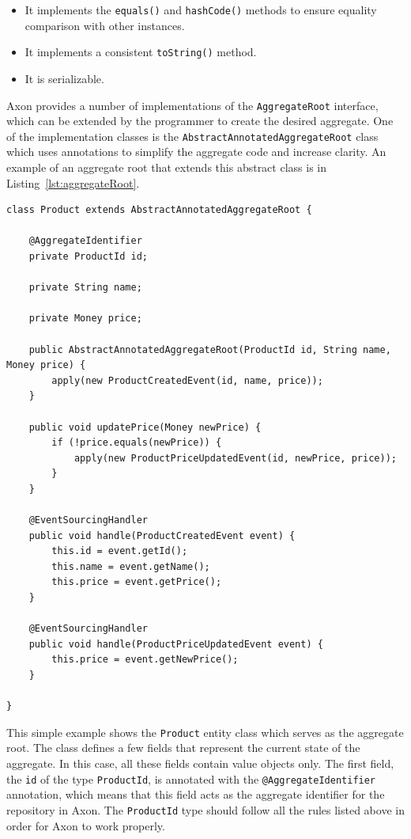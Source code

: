 \documentclass{book}
\begin{document}
\begin{itemize}
\tightlist
\item
  It implements the \texttt{equals()} and \texttt{hashCode()} methods to
  ensure equality comparison with other instances.
\item
  It implements a consistent \texttt{toString()} method.
\item
  It is serializable.
\end{itemize}

Axon provides a number of implementations of the \texttt{AggregateRoot}
interface, which can be extended by the programmer to create the desired
aggregate. One of the implementation classes is the
\texttt{AbstractAnnotatedAggregateRoot} class which uses annotations to
simplify the aggregate code and increase clarity. An example of an
aggregate root that extends this abstract class is in Listing~\ref{lst:aggregateRoot}.

\begin{lstlisting}[caption={An example of an annotated-based aggregate root class in Axon},label={lst:aggregateRoot},captionpos=b,float,floatplacement=H]
class Product extends AbstractAnnotatedAggregateRoot {

    @AggregateIdentifier
    private ProductId id;

    private String name;

    private Money price;

    public AbstractAnnotatedAggregateRoot(ProductId id, String name, Money price) {
        apply(new ProductCreatedEvent(id, name, price));
    }

    public void updatePrice(Money newPrice) {
        if (!price.equals(newPrice)) {
            apply(new ProductPriceUpdatedEvent(id, newPrice, price));
        }
    }

    @EventSourcingHandler
    public void handle(ProductCreatedEvent event) {
        this.id = event.getId();
        this.name = event.getName();
        this.price = event.getPrice();
    }

    @EventSourcingHandler
    public void handle(ProductPriceUpdatedEvent event) {
        this.price = event.getNewPrice();
    }

}
\end{lstlisting}

This simple example shows the \texttt{Product} entity class which serves
as the aggregate root. The class defines a few fields that represent the
current state of the aggregate. In this case, all these fields contain
value objects only. The first field, the \texttt{id} of the type
\texttt{ProductId}, is annotated with the \texttt{@AggregateIdentifier}
annotation, which means that this field acts as the aggregate identifier
for the repository in Axon. The \texttt{ProductId} type should follow
all the rules listed above in order for Axon to work properly.
\end{document}
